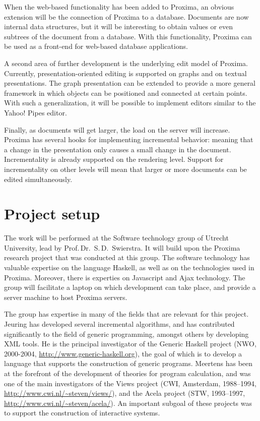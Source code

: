 \documentclass[10pt]{article}
\begin{document}
When the web-based functionality has been added to Proxima, an obvious extension will be the connection of Proxima to a database. Documents are now internal data structures, but it will be interesting to obtain values or even subtrees of the document from a database. With this functionality, Proxima can be used as a front-end for web-based database applications.

A second area of further development is the underlying edit model of Proxima. Currently, presentation-oriented editing is supported on graphs and on textual presentations. The graph presentation can be extended to provide a more general framework in which objects can be positioned and connected at certain points. With such a generalization, it will be possible to implement editors similar to the Yahoo! Pipes editor.

Finally, as documents will get larger, the load on the server will increase. Proxima has several hooks for implementing incremental behavior: meaning that a change in the presentation only causes a small change in the document. Incrementality is already supported on the rendering level. Support for incrementality on other levels will mean that larger or more documents can be edited simultaneously.


\section{Project setup}

The work will be performed at the Software technology group of Utrecht University, lead by Prof.\,Dr.~S.\,D.~Swierstra. It will build upon the Proxima research project that was conducted at this group. The software technology has valuable expertise on the language Haskell, as well as on the technologies used in Proxima. Moreover, there is experties on Javascript and Ajax technology. The group will facilitate a laptop on which development can take place, and provide a server machine to host Proxima servers.

\bc
The group has expertise in many of the fields that are relevant for
this project.
Jeuring has developed several incremental algorithms, and has 
contributed significantly to the field of generic programming, amongst
others by developing XML tools. He is the principal investigator of
the Generic Haskell project (NWO, 2000-2004, \url{http://www.generic-haskell.org}),
the goal of which is to develop a language that supports the construction of generic
programs. Meertens has been at the forefront of the development of
theories for program calculation, and was one of the main
investigators of the Views project (CWI, Amsterdam, 1988--1994, 
\url{http://www.cwi.nl/~steven/views/}), 
and the Acela project (STW, 1993--1997, 
\url{http://www.cwi.nl/~steven/acela/}). An important subgoal of
these projects was to support the construction of interactive systems.
\end{document}
